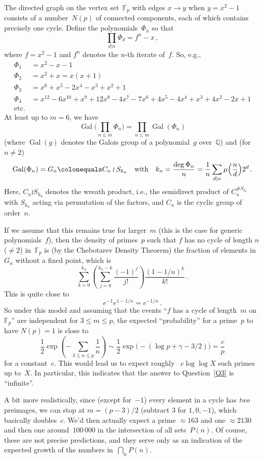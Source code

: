 \documentclass[12pt,a4paper]{amsart}
\newcommand{\Q}{{\mathbb Q}}
\newcommand{\F}{{\mathbb F}}
\newcommand{\Gal}{\operatorname{Gal}}
\theoremstyle{definition}
\numberwithin{equation}{section}
\begin{document}
The directed graph on the vertex set~$\F_p$ with edges $x \to y$ when $y = x^2 - 1$
consists of a number~$N(p)$ of connected components, each of which contains
precisely one cycle. Define the polynomials~$\Phi_n$ so that
\[ \prod_{d|n} \Phi_d = f^n - x \,, \]
where $f = x^2 - 1$ and $f^n$ denotes the $n$-th iterate of~$f$. So, e.g.,
\begin{align*}
  \Phi_1 &= x^2 - x - 1 \\
  \Phi_2 &= x^2 + x = x   (x + 1) \\
  \Phi_3 &= x^6 + x^5 - 2 x^4 - x^3 + x^2 + 1 \\
  \Phi_4 &= x^{12} - 6 x^{10} + x^9 + 12 x^8 - 4 x^7 - 7 x^6 + 4 x^5 - 4 x^4 + x^3 + 4 x^2 - 2 x + 1 \\
  \text{etc.}
\end{align*}
At least up to $m = 6$, we have
\[ \Gal\bigl(\prod_{n \leqslant m} \Phi_n\bigr) = \prod_{n \leqslant m} \Gal(\Phi_n) \]
(where $\Gal(g)$ denotes the Galois group of a polynomial~$g$ over~$\Q$)
and (for $n \neq 2$)
\[ \Gal(\Phi_n) = G_n \colonequals C_n \wr S_{k_n} \quad \text{with} \quad
      k_n = \frac{\deg \Phi_n}{n} = \frac{1}{n} \sum_{d \mid n} \mu\Bigl(\frac{n}{d}\Bigr) 2^d \,.
\]
Here, $C_n \wr S_{k_n}$ denotes the wreath product, i.e., the semidirect product of $C_n^{\#S_{k_n}}$
with $S_{k_n}$ acting via permutation of the factors, and $C_n$ is the cyclic group of order~$n$.

If we assume that this remains true for larger~$m$ (this is the case for generic polynomials~$f$),
then the density of primes~$p$
such that $f$ has no cycle of length $n$ ($\neq 2$) in~$\F_p$ is (by the Chebotarev Density Theorem)
the fraction of elements in~$G_n$ without a fixed point, which is
\[ \sum_{k=0}^{k_n} \left(\sum_{j=0}^{k_n-k} \frac{(-1)^j}{j!}\right) \frac{(1 - 1/n)^k}{k!} \,. \]
This is quite close to
\[ e^{-1} e^{1 - 1/n} = e^{-1/n} \,. \]
So under this model and assuming that the events ``$f$ has a cycle of length~$m$ on~$\F_p$''
are independent for $3 \leqslant m \leqslant p$,
the expected ``probability'' for a prime~$p$ to have $N(p) = 1$ is close to
\[ \frac{1}{2} \exp\left(-\sum_{3 \leqslant n \leqslant p} \frac{1}{n}\right)
    \sim \frac{1}{2} \exp\bigl(-(\log p + \gamma - 3/2)\bigr)
    = \frac{c}{p}
\]
for a constant~$c$. This would lead us to expect roughly ~$c \log \log X$  such primes
up to~$X$. In particular, this indicates that the answer to Question~\ref{Q3} is
``infinite''.

A bit more realistically, since (except for~$-1$) every element in a cycle
has \emph{two} preimages, we can stop at $m = (p-3)/2$  (subtract $3$ for $1, 0, -1$),
which basically doubles~$c$.
We'd then actually expect a prime $\approx 163$ and one $\approx 2130$ and then one
around~$100\,000$ in the intersection of all sets~$P(n)$. Of course, these are not
precise predictions, and they serve only as an indication of the expected growth
of the numbers in~$\bigcap_n P(n)$.
\end{document}
